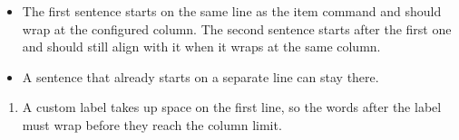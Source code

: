 \begin{itemize}
    \item The first sentence starts on the same line as the item command and
          should wrap at the configured column.
          The second sentence starts after the first one and should still
          align with it when it wraps at the same column.
    \item
          A sentence that already starts on a separate line can stay there.
\end{itemize}
\begin{enumerate}
    \item[Review]A custom label takes up space on the first line, so the
                 words after the label must wrap before they reach the column
                 limit.
\end{enumerate}
